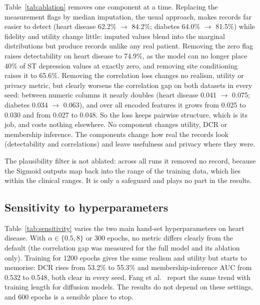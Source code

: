 \documentclass[runningheads]{llncs}
\begin{document}
Table~\ref{tab:ablation} removes one component at a time. Replacing the
measurement flags by median imputation, the usual approach, makes records
far easier to detect (heart disease 62.2\% $\to$ 84.2\%; diabetes
64.0\% $\to$ 81.5\%) while fidelity and utility change little: imputed values
blend into the marginal distributions but produce records unlike any real
patient. Removing the zero flag raises detectability on heart disease to
74.9\%, as the model can no longer place 40\% of ST depression values at
exactly zero, and removing site conditioning raises it to 65.6\%.
Removing the correlation loss changes no realism, utility or privacy
metric, but clearly worsens the correlation gap on both datasets in every
seed: between numeric columns it nearly doubles (heart disease 0.041 $\to$
0.075; diabetes 0.034 $\to$ 0.063), and over all encoded features it grows
from 0.025 to 0.030 and from 0.027 to 0.048. So the loss keeps pairwise structure, which is its job, and costs
nothing elsewhere. No component changes utility, DCR or membership
inference. The components change how real the records look
(detectability and correlations) and leave usefulness and privacy where
they were.

The plausibility filter is not ablated: across all runs it removed no
record, because the Sigmoid outputs map back into the range of the training
data, which lies within the clinical ranges. It is only a safeguard and
plays no part in the results.

\subsection{Sensitivity to hyperparameters}

\begin{table}[t]
\caption{Sensitivity of the full model on heart disease to the correlation
weight $\alpha$ (default 2) and the number of training epochs (default
600); $^*$ as in
Table~\ref{tab:ablation}.}
\label{tab:sensitivity}
\centering\scriptsize\setlength{\tabcolsep}{2.5pt}
\resizebox{\textwidth}{!}{}
\end{table}

Table~\ref{tab:sensitivity} varies the two main hand-set hyperparameters on
heart disease. With $\alpha \in \{0.5, 8\}$ or 300 epochs, no metric differs
clearly from the default (the correlation gap was measured for the full
model and its ablation only). Training for 1200 epochs gives the same realism
and utility but starts to memorise: DCR rises from 53.2\% to 55.3\% and
membership-inference AUC from 0.532 to 0.548, both clear in every seed.
Fang et al.~\cite{fang2025memorization} report the same trend with
training length for diffusion models. The results do not depend on these
settings, and 600 epochs is a sensible place to stop.
\end{document}
